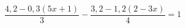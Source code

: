 \begin{ex}[type=equation]
	\begin{condition}
		$\dfrac{4,2 - 0,3(5x+1)}{3} - \dfrac{3,2 - 1,2(2-3x)}{4} = 1$
	\end{condition}
\end{ex}